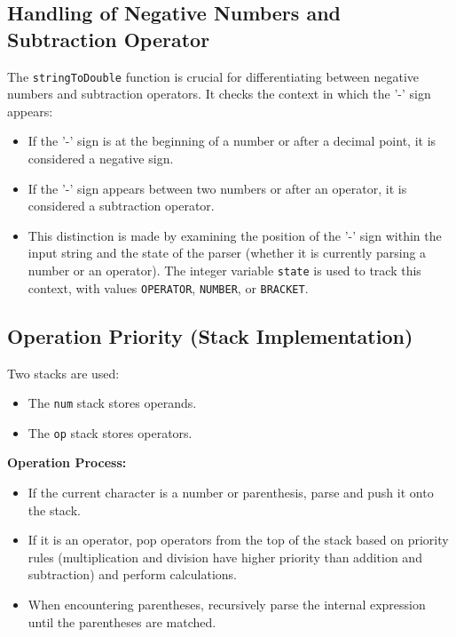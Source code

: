 \documentclass{article}
\begin{document}
\subsection{Handling of Negative Numbers and Subtraction Operator}

The \texttt{stringToDouble} function is crucial for differentiating between negative numbers and subtraction operators. It checks the context in which the '-' sign appears:
\begin{itemize}
\item If the '-' sign is at the beginning of a number or after a decimal point, it is considered a negative sign.
\item If the '-' sign appears between two numbers or after an operator, it is considered a subtraction operator.
\item This distinction is made by examining the position of the '-' sign within the input string and the state of the parser (whether it is currently parsing a number or an operator). The integer variable \texttt{state} is used to track this context, with values \texttt{OPERATOR}, \texttt{NUMBER}, or \texttt{BRACKET}.
\end{itemize}

\subsection{Operation Priority (Stack Implementation)}

Two stacks are used:
\begin{itemize}
\item The \texttt{num} stack stores operands.
\item The \texttt{op} stack stores operators.
\end{itemize}

\textbf{Operation Process:}
\begin{itemize}
\item If the current character is a number or parenthesis, parse and push it onto the stack.
\item If it is an operator, pop operators from the top of the stack based on priority rules (multiplication and division have higher priority than addition and subtraction) and perform calculations.
\item When encountering parentheses, recursively parse the internal expression until the parentheses are matched.
\end{itemize}
\end{document}
